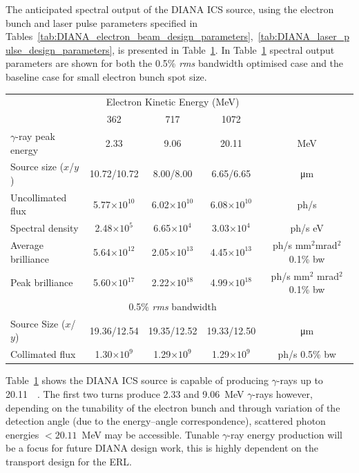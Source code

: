 \documentclass[../main.tex]{subfiles}
\begin{document}
The anticipated spectral output of the DIANA ICS source, using the electron bunch and laser pulse parameters specified in Tables~\ref{tab:DIANA_electron_beam_design_parameters},~\ref{tab:DIANA_laser_pulse_design_parameters}, is presented in Table~\ref{tab:DIANA_spectral_output}. In Table~\ref{tab:DIANA_spectral_output} spectral output parameters are shown for both the 0.5\% \textit{rms} bandwidth optimised case and the baseline case for small electron bunch spot size. 

\begin{table}[!h]
\centering
\begin{tabular}{lcccc}
\hline\hline
 & \multicolumn{3}{c}{Electron Kinetic Energy (\si{\mega\electronvolt})} & \\
 \cline{2-4}
 & 362 & 717 & 1072 & \\
\hline
$\gamma$-ray peak energy  & 2.33 & 9.06 & 20.11 & \si{\mega\electronvolt}\\
Source size ($x$/$y$)  & 10.72/10.72 & 8.00/8.00 & 6.65/6.65 & \si{\micro\meter} \\
Uncollimated flux  & 5.77$\times 10^{10}$ & 6.02$\times 10^{10}$ & 6.08$\times 10^{10}$ & ph/\si{\second}\\
Spectral density  & 2.48$\times 10^{5}$ & 6.65$\times 10^{4}$ & 3.03$\times 10^{4}$ & ph/\si{\second} \si{\electronvolt}\\
Average brilliance  & 5.64$\times 10^{12}$ & 2.05$\times 10^{13}$ & 4.45$\times 10^{13}$ & ph/\si{\second} \si{\milli\meter}$^{2}$\si{\milli\radian}$^{2}$ 0.1\% bw\\
Peak brilliance  & 5.60$\times 10^{17}$ & 2.22$\times 10^{18}$ & 4.99$\times 10^{18}$ & ph/\si{\second} \si{\milli\meter}$^{2}$ \si{\milli\radian}$^{2}$ 0.1\% bw\\
\hline
 & \multicolumn{3}{c}{0.5\% \textit{rms} bandwidth} & \\
\hline
Source Size ($x$/$y$) & 19.36/12.54 & 19.35/12.52 & 19.33/12.50 & \si{\micro\meter} \\ 
Collimated flux  & 1.30$\times 10^{9}$ & 1.29$\times 10^{9}$ & 1.29$\times 10^{9}$ & ph/\si{\second} 0.5\% bw \\
\hline\hline
\end{tabular}
\label{tab:DIANA_spectral_output}
\end{table}

Table~\ref{tab:DIANA_spectral_output} shows the DIANA ICS source is capable of producing $\gamma$-rays up to 20.11~\si{\mega\electronvolts}. The first two turns produce 2.33 and 9.06~\si{\mega\electronvolt} $\gamma$-rays however, depending on the tunability of the electron bunch and through variation of the detection angle (due to the energy--angle correspondence), scattered photon energies $< 20.11$~\si{\mega\electronvolt} may be accessible. Tunable $\gamma$-ray energy production will be a focus for future DIANA design work, this is highly dependent on the transport design for the ERL. 
\end{document}
